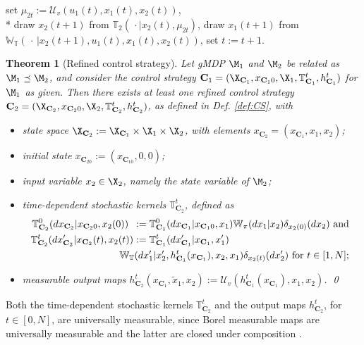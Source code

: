 \documentclass[letterpaper, 10 pt, conference]{amsart}
\newtheorem{thm}[theorem]{Theorem}
\theoremstyle{definition}
\theoremstyle{example}
\theoremstyle{remark}
\newcommand{\InF}{\mathcal{U}_{v}}
\newcommand{\C}{{\mathbf{C}}}
\newcommand{\Wt}{\mathbb{W}_{\mathbb{T}}}
\begin{document}
\begin{algorithm}[htp]\caption{Refinement of control strategy ${\mathbf{C}}_1$ as $\mathbf{C}_2$}\label{alg:refinement}\begin{algorithmic}[1]
\LOOP
{}
\STATE  set $\mu_{2t}:=\InF(u_1(t),x_1(t),x_2(t))$, \\*
\STATE draw $x_2(t+1)$ from $\mathbb{T}_2(\,\cdot\mid x_2(t),\mu_{2t})$,
 \STATE  draw $x_1(t+1)$ from $\Wt(\,\cdot\,|x_2(t+1), u_1(t), x_1(t),x_2(t))$,  \label{alg2:remx2}
\STATE  set $t:=t+1$. 
\ENDLOOP
\end{algorithmic} \end{algorithm}\begin{thm}[Refined control strategy]\label{thm:Cs1}
Let gMDP $\M_1$ and $\M_2$ be related as $\M_1\preceq\M_2$, 
and consider the control strategy $\C_1=(\X_{\C_1},x_{\C_10},\X_1,\mathbb T_{\C_1}^t,h_{\C_1}^t)$ for $ \M_1$ as given. 
Then there exists at least one refined control strategy $\C_2=(\X_{\C_2},x_{\C_20},\X_2,\mathbb T_{\C_2}^t,h_{\C_2}^t)$, 
as defined in Def. \ref{def:CS}, with \begin{itemize}
\item state space $\X_{\C_2}:=\X_{\C_1}\times \X_1\times \X_2$, 
with elements $x_{\C_2}=(x_{\C_1}, x_1,x_2)$; 
\item initial state $x_{\C_20}:=(x_{\C_10},0,0)$;
\item input variable $x_2\in\X_2$, namely the state variable of $\M_2$;  
\item time-dependent stochastic kernels $\mathbb T^t_{\C_2}$, defined as\begin{align*} 
\mathbb T^0_{\C_2} (dx_{\C_2}{\mid}x_{\C_20},x_2(0) )\ \, &:=\mathbb T^0_{\C_1} (dx_{\C_1}{\mid}x_{\C_10},x_1)\mathbb W_\pi(dx_1 {\mid} x_2 )\delta_{x_2(0)}(dx_2) \mbox{ and }\\
\mathbb T^t_{\C_2} (dx_{\C_2}'{\mid}x_{\C_2}(t),x_2(t) )&:=\mathbb T^t_{\C_1} (dx_{\C_1}'{\mid}x_{\C_1},x_1')\\ &\hspace{-.5cm}
\Wt(d x_1' {\mid} x_2',h_{\C_1}^t(x_{\C_1}),x_2, x_1)\delta_{x_2(t)}(dx'_2) \mbox{ for $t\in[1,N]$};
\end{align*}
\item measurable output maps $h^t_{\C_2}(x_{\C_1},\tilde x_1,x_2):= \InF(h^t_{\C_1}(x_{\C_1}),x_1, x_2)$. 
\qed  
\end{itemize}
\end{thm}
Both the time-dependent stochastic kernels $\mathbb T^t_{\C_2}$ and the output maps $h_{\C_2}^t$, for $t\in[0,N]$, are universally measurable, 
since Borel measurable maps are universally measurable and the latter are closed under composition \cite[Ch.7]{bible}.  
 
\end{document}
